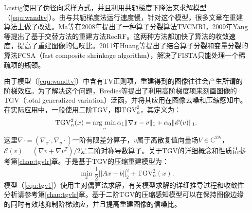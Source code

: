 Lustig使用了伪径向采样方式，并且利用共轭梯度下降法来求解模型（\ref{equ:wandtv}）。由与共轭梯度法运行速度慢，针对这个模型，很多文章在重建算法上做了改进。Ma等在2008年提出了一种算子分裂算法TVCMRI\cite{tvcmri}，2009年Yang等提出了基于交替方法的重建方法RecRF\cite{Yang2010A}。这两种方法都加快了算法的收敛速度，提高了重建图像的信噪比。2011年Huang\cite{Huang2011Efficient}等提出了结合算子分裂和变量分裂的算法FCSA（fast composite shrinkage algorithm），解决了FISTA只能处理一个稀疏项的瓶颈。

由于模型（\ref{equ:wandtv}）中含有TV正则项，重建得到的图像往往会产生所谓的阶梯效应。为了解决这个问题，Bredies等\cite{bredies2010total}提出了利用高阶梯度项来刻画图像的TGV（total generalized variation）泛函，并将其应用在图像去噪\cite{infimaltgv}和压缩感知\cite{tgv}中。在实际应用中，一般使用二阶TGV，即$\mathrm{TGV}_{\alpha}^2$，其定义为：
$$\mathrm{TGV}_\alpha^2(x)=\argmin_v \alpha_1\|\nabla x-v\|_1+\alpha_0\|\mathscr{E}(v)\|_1.$$
这里$\nabla \cdot=(\nabla_x \cdot, \nabla_y \cdot)$一阶有限差分算子，$v$属于离散复值向量场$V\in \mathbb{C}^{2N}$，$\mathscr{E}(v)=(\nabla v+\nabla v^T)/2$是二阶对称导数算子。关于TGV的详细概念和性质请参考第\ref{chap:tgvlr}章。于是基于TGV的压缩重建模型为：
\begin{equation}
	\min_x\frac{1}{2}||Ax-b||^2_2 + \mathrm{TGV}_{\alpha}^2(x).
	\label{equ:tgv1}
\end{equation}
模型（\ref{equ:tgv1}）使用主对偶算法求解，有关模型求解的详细推导过程和收敛性分析请参考第\ref{chap:tgvlr}章。基于二阶TGV的压缩感知模型可以在保持图像边缘的同时有效地抑制阶梯效应，并且提高重建图像的信噪比。

